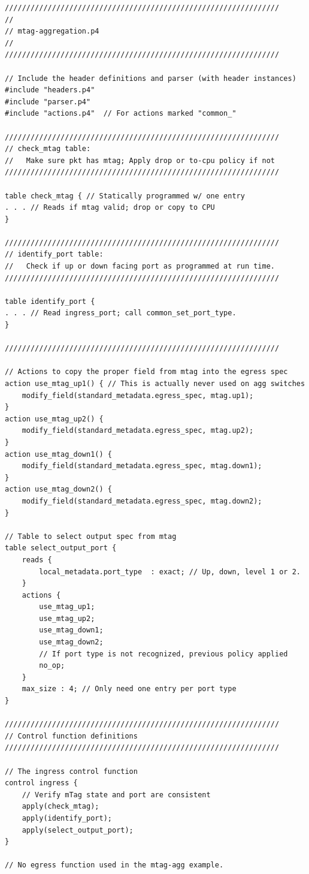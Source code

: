 \documentclass[12pt]{article}
\begin{document}
\begin{lstlisting}[keywords={},frame=single,escapechar=\@]
////////////////////////////////////////////////////////////////
//
// mtag-aggregation.p4
//
////////////////////////////////////////////////////////////////

// Include the header definitions and parser (with header instances)
#include "headers.p4"
#include "parser.p4"
#include "actions.p4"  // For actions marked "common_"

////////////////////////////////////////////////////////////////
// check_mtag table:  
//   Make sure pkt has mtag; Apply drop or to-cpu policy if not
////////////////////////////////////////////////////////////////

table check_mtag { // Statically programmed w/ one entry
. . . // Reads if mtag valid; drop or copy to CPU
}

////////////////////////////////////////////////////////////////
// identify_port table:  
//   Check if up or down facing port as programmed at run time.
////////////////////////////////////////////////////////////////

table identify_port {
. . . // Read ingress_port; call common_set_port_type.
}

////////////////////////////////////////////////////////////////

// Actions to copy the proper field from mtag into the egress spec
action use_mtag_up1() { // This is actually never used on agg switches
    modify_field(standard_metadata.egress_spec, mtag.up1);
}
action use_mtag_up2() {
    modify_field(standard_metadata.egress_spec, mtag.up2);
}
action use_mtag_down1() {
    modify_field(standard_metadata.egress_spec, mtag.down1);
}
action use_mtag_down2() {
    modify_field(standard_metadata.egress_spec, mtag.down2);
}

// Table to select output spec from mtag
table select_output_port {
    reads {
        local_metadata.port_type  : exact; // Up, down, level 1 or 2.
    }
    actions {
        use_mtag_up1;
        use_mtag_up2;
        use_mtag_down1;
        use_mtag_down2;
        // If port type is not recognized, previous policy applied
        no_op; 
    }
    max_size : 4; // Only need one entry per port type
}

////////////////////////////////////////////////////////////////
// Control function definitions
////////////////////////////////////////////////////////////////

// The ingress control function
control ingress {
    // Verify mTag state and port are consistent
    apply(check_mtag);
    apply(identify_port);
    apply(select_output_port);
}

// No egress function used in the mtag-agg example.
\end{lstlisting}
\end{document}
